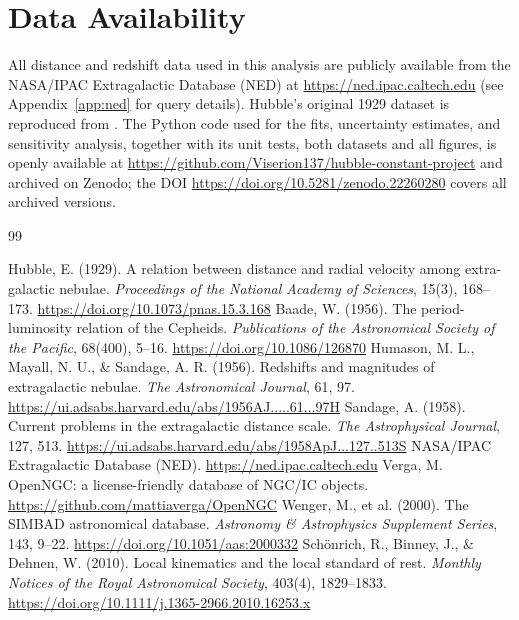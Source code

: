 \documentclass[11pt]{article}
\begin{document}
\section*{Data Availability}
All distance and redshift data used in this analysis are publicly available from the NASA/IPAC Extragalactic Database (NED) at \url{https://ned.ipac.caltech.edu} (see Appendix~\ref{app:ned} for query details). Hubble's original 1929 dataset is reproduced from \citet{hubble1929}. The Python code used for the fits, uncertainty estimates, and sensitivity analysis, together with its unit tests, both datasets and all figures, is openly available at \url{https://github.com/Viserion137/hubble-constant-project} and archived on Zenodo; the DOI \url{https://doi.org/10.5281/zenodo.22260280} covers all archived versions.

\begin{thebibliography}{99}
Hubble, E. (1929). A relation between distance and radial velocity among extra-galactic nebulae. \textit{Proceedings of the National Academy of Sciences}, 15(3), 168--173. \url{https://doi.org/10.1073/pnas.15.3.168}
Baade, W. (1956). The period-luminosity relation of the Cepheids. \textit{Publications of the Astronomical Society of the Pacific}, 68(400), 5--16. \url{https://doi.org/10.1086/126870}
Humason, M. L., Mayall, N. U., \& Sandage, A. R. (1956). Redshifts and magnitudes of extragalactic nebulae. \textit{The Astronomical Journal}, 61, 97. \url{https://ui.adsabs.harvard.edu/abs/1956AJ.....61...97H}
Sandage, A. (1958). Current problems in the extragalactic distance scale. \textit{The Astrophysical Journal}, 127, 513. \url{https://ui.adsabs.harvard.edu/abs/1958ApJ...127..513S}
NASA/IPAC Extragalactic Database (NED). \url{https://ned.ipac.caltech.edu}
Verga, M. OpenNGC: a license-friendly database of NGC/IC objects. \url{https://github.com/mattiaverga/OpenNGC}
Wenger, M., et al. (2000). The SIMBAD astronomical database. \textit{Astronomy \& Astrophysics Supplement Series}, 143, 9--22. \url{https://doi.org/10.1051/aas:2000332}
Sch\"onrich, R., Binney, J., \& Dehnen, W. (2010). Local kinematics and the local standard of rest. \textit{Monthly Notices of the Royal Astronomical Society}, 403(4), 1829--1833. \url{https://doi.org/10.1111/j.1365-2966.2010.16253.x}

\end{thebibliography}
\end{document}
